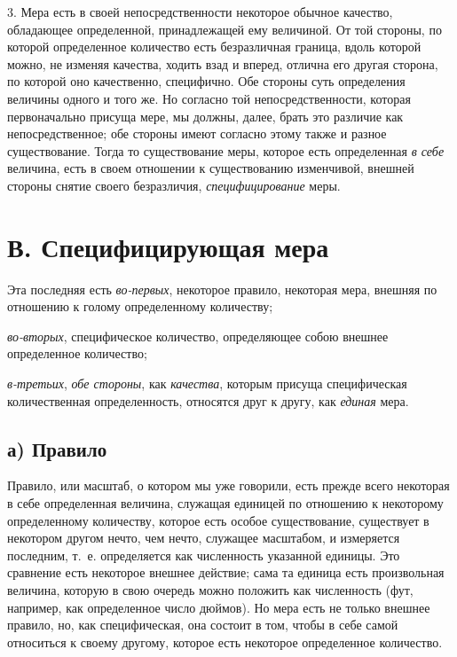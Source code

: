 3. Мера есть в своей непосредственности некоторое обычное качество,
обладающее определенной, принадлежащей ему величиной. От той стороны, по
которой определенное количество есть безразличная граница, вдоль которой
можно, не изменяя качества, ходить взад и вперед, отлична его другая
сторона, по которой оно качественно, специфично. Обе стороны суть
определения величины одного и того же. Но согласно той непосредственности,
которая первоначально присуща мере, мы должны, далее, брать это различие
как непосредственное; обе стороны имеют согласно этому также и разное
существование. Тогда то существование меры, которое есть определенная
{\em в себе} величина, есть в своем отношении к
существованию изменчивой, внешней стороны снятие своего безразличия,
{\em специфицирование} меры.


\section[В. Специфицирующая мера]{В. Специфицирующая мера}

Эта последняя есть {\em во-первых}, некоторое правило, некоторая мера,
внешняя по отношению к голому определенному количеству;

{\em во-вторых}, специфическое количество, определяющее
собою внешнее определенное количество;

{\em в-третьих}, {\em обе стороны},
как {\em качества}, которым присуща специфическая
количественная определенность, относятся друг к другу, как
{\em единая} мера.

\subsection[а) Правило]{а) Правило}
Правило, или масштаб, о котором
мы уже говорили, есть прежде всего некоторая в себе определенная величина,
служащая единицей по отношению к некоторому определенному количеству,
которое есть особое существование, существует в некотором другом нечто, чем
нечто, служащее масштабом, и измеряется последним, т.~е. определяется как
численность указанной единицы. Это сравнение есть некоторое внешнее
действие; сама та единица есть произвольная величина, которую в свою
очередь можно положить как численность (фут, например, как определенное
число дюймов). Но мера есть не только внешнее правило, но, как
специфическая, она состоит в том, чтобы в себе самой относиться к своему
другому, которое есть некоторое определенное количество.

